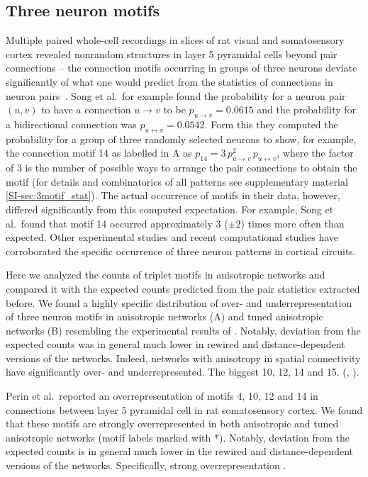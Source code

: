 \clearpage
\pagebreak
\newpage
\subsection*{Three neuron motifs}

Multiple paired whole-cell recordings in slices of rat visual and
somatosensory cortex revealed nonrandom structures in layer 5
pyramidal cells beyond pair connections -- the connection motifs
occurring in groups of three neurons deviate significantly of what one
would predict from the statistics of connections in neuron
pairs~\cite{Song2005, Perin2011}. Song et al.~for example found the
probability for a neuron pair $(u,v)$ to have a connection
$u \rightarrow v$ to be $p_{u \rightarrow v}= 0.0615$ and the
probability for a bidirectional connection was
$p_{u \leftrightarrow v} = 0.0542$. Form this they computed the
probability for a group of three randomly selected neurons to show,
for example, the connection motif 14 as labelled in
A as
$p_{14}= 3 \,p_{u \rightarrow v}^2 \, p_{u \leftrightarrow v}$, where
the factor of 3 is the number of possible ways to arrange the pair
connections to obtain the motif (for details and combinatorics of all
patterns see supplementary material \ref{SI-sec:3motif_stat}). The
actual occurrence of motifs in their data, however, differed
significantly from this computed expectation. For example, Song et
al.~found that motif 14 occurred approximately 3 ($\pm 2$) times more
often than expected. Other experimental studies \cite{Perin2011,
  Rieubland2014} and recent computational studies
\cite{Miner2016,Gal2017} have corroborated the specific occurrence of
three neuron patterns in cortical circuits.

Here we analyzed the counts of triplet motifs in anisotropic networks
and compared it with the expected counts predicted from the pair
statistics extracted before. We found a highly specific distribution
of over- and underrepresentation of three neuron motifs in anisotropic
networks (A) and tuned anisotropic networks
(B) resembling the experimental results of
\textcite{Song2005}.%
%
%
%
Notably, deviation from the expected counts was in general much lower
in rewired and distance-dependent versions of the networks. Indeed,
networks with anisotropy in spatial connectivity have significantly
over- and underrepresented. The biggest 10, 12, 14 and
15. (, ).


Perin et al.~reported an overrepresentation of motifs 4, 10, 12 and 14
in connections between layer 5 pyramidal cell in rat somatosensory
cortex. We found that these motifs are strongly overrepresented in
both anisotropic and tuned anisotropic networks (motif labels marked
with *). Notably, deviation from the expected counts is in general
much lower in the rewired and distance-dependent versions of the
networks. Specifically, strong overrepresentation .

